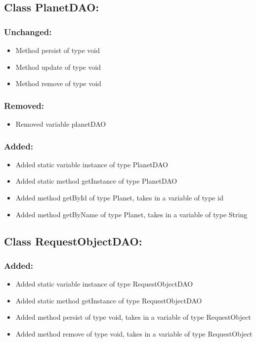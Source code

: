 \documentclass{article}
\begin{document}

\subsection{Class PlanetDAO:}

\subsubsection{Unchanged:}
\begin{itemize}
\item Method persist of type void
\item Method update of type void
\item Method remove of type void
\end{itemize}

\subsubsection{Removed:}
\begin{itemize}
\item Removed variable planetDAO
\end{itemize}

\subsubsection{Added:}
\begin{itemize}
\item Added static variable instance of type PlanetDAO
\item Added static method getInstance of type PlanetDAO
\item Added method getById of type Planet, takes in a variable of type id
\item Added method getByName of type Planet, takes in a variable of type String
\end{itemize}


\subsection{Class RequestObjectDAO:}

\subsubsection{Added:}
\begin{itemize}
\item Added static variable instance of type RequestObjectDAO
\item Added static method getInstance of type RequestObjectDAO
\item Added method persist of type void, takes in a variable of type RequestObject
\item Added method remove of type void, takes in a variable of type RequestObject
\end{itemize}
\end{document}
